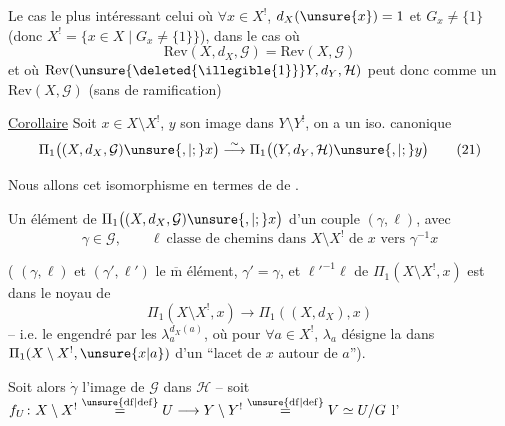 
Le cas le plus intéressant 
celui où  $\forall x\in X^{!}$, 
$d_X(\unsure{x})=1$ et $G_x\ne\{1\}$
(donc $X^{!}=\{x\in X\mid G_x\ne\{1\}\}$), dans le cas où
\[
\mathrm{Rev}(X,d_X,\mathcal G)=\mathrm{Rev}(X,\mathcal G) \tag{20}
\]
et où $\mathrm{Rev}(\unsure{\deleted{\illegible{1}}}Y,d_Y,\mathcal H)$ peut donc
 comme un $\mathrm{Rev}(X,\mathcal G)$
(sans  de ramification)



\uline{Corollaire} Soit $x\in X\setminus X^{!}$, $y$ son image dans
$Y\setminus Y^{!}$, on a un iso. canonique
\[
\Pi_1\bigl((X,d_X,\mathcal G)\unsure{,|;}x\bigr)
\overset{\sim}{\longrightarrow}
\Pi_1\bigl((Y,d_Y,\mathcal H)\unsure{,|;}y\bigr) \tag{21}
\]

Nous allons  cet isomorphisme en termes de
 de .

Un élément\inserted{$\alpha$} de
$\Pi_1\bigl((X,d_X,\mathcal G)\unsure{,|;}x\bigr)$
 d'un couple $(\gamma,\ell)$, avec
\[
\gamma\in\mathcal G,\qquad
\ell\ \text{classe de chemins dans }X\setminus X^{!}
\text{ de }x\text{ vers }\gamma^{-1}x
\]

( $(\gamma,\ell)$ et $(\gamma',\ell')$  le
$\overline{\mathrm m}$ élément,  $\gamma'=\gamma$, et
 $\ell'^{-1}\ell$ de $\Pi_1(X\setminus X^{!},x)$ est
dans le   noyau de
\[
\Pi_1(X\setminus X^{!},x)\longrightarrow\Pi_1((X,d_X),x)
\]
-- i.e. le   engendré par les
 $\lambda_a^{d_X(a)}$, où
pour $\forall a\in X^{!}$, $\lambda_a$ désigne la  dans
$\Pi_1(X\setminus X^{!},\unsure{x|a})$ d'un ``lacet de $x$ autour de $a$'').

Soit alors $\dot\gamma$ l'image de $\mathcal G$ dans $\mathcal H$ --
 soit
$f_U\colon X\setminus X^{!}\overset{\unsure{\mathrm{df}|\mathrm{def}}}{=}U
\longrightarrow Y\setminus Y^{!}\overset{\unsure{\mathrm{df}|\mathrm{def}}}{=}V
\simeq U/G$ l'

